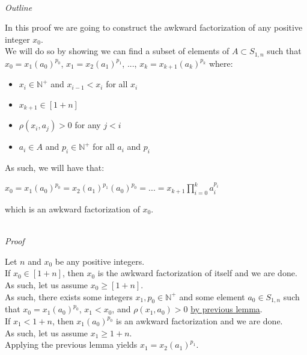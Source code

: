 \documentclass[a4paper,12pt]{article}
\begin{document}
\noindent\\
\textit{Outline}

\noindent In this proof we are going to construct the awkward factorization of any positive integer $x_0$.\\

\noindent We will do so by showing we can find a subset of elements of $A \subset S_{1, n}$ such that $x_0 = x_1(a_0)^{p_0}$, $x_1 = x_2(a_1)^{p_1}$, ..., $x_k = x_{k + 1}(a_k)^{p_k}$ where:
\begin{itemize}
\item $x_i \in \mathbb{N}^+$ and $x_{i - 1} < x_i$ for all $x_i$
\item $x_{k+1} \in [1 + n]$
\item $\rho(x_i, a_j) > 0$ for any $j < i$
\item $a_i \in A$ and $p_i \in \mathbb{N}^+$ for all $a_i$ and $p_i$
\end{itemize}

\noindent As such, we will have that:
\begin{center}
$x_0 = x_1(a_0)^{p_0} = x_2(a_1)^{p_1}(a_0)^{p_0} = ... = \displaystyle x_{k + 1} \prod_{i = 0}^k a_i^{p_i}$
\end{center}
which is an awkward factorization of $x_0$.


\noindent \\
\textit{Proof}

\noindent Let $n$ and $x_0$ be any positive integers.\\

\noindent If $x_0 \in [1 + n]$, then $x_0$ is the awkward factorization of itself and we are done.\\

\noindent As such, let us assume $x_0 \geq [1 + n]$.\\

\noindent As such, there exists some integers $x_1, p_0 \in \mathbb{N}^+$ and some element $a_0 \in S_{1, n}$ such that $x_0 = x_1(a_0)^{p_0}$, $x_1 < x_0$, and $\rho(x_1, a_0) > 0$ \hyperlink{lemma:non_common_factorization}{by previous lemma}.\\

\noindent If $x_1 < 1 + n$, then $x_1(a_0)^{p_0}$ is an awkward factorization and we are done.\\

\noindent As such, let us assume $x_1 \geq 1 + n$.\\

\noindent Applying the previous lemma yields $x_1 = x_2(a_1)^{p_1}$.\\
\end{document}
